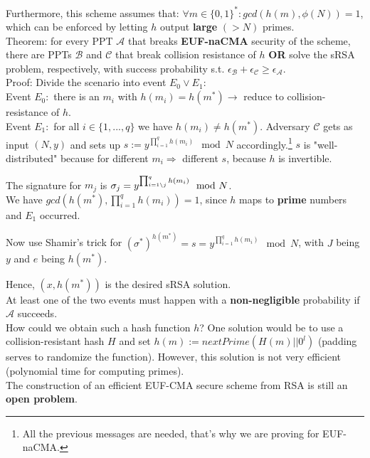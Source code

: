 \documentclass[oneside]{book}
\newcommand{\cA}[0]{\mathcal{A}}
\newcommand{\cB}[0]{\mathcal{B}}
\newcommand{\cC}[0]{\mathcal{C}}
\begin{document}
Furthermore, this scheme assumes that: $\forall m \in \{0,1\}^*: gcd(h(m), \phi(N)) = 1$, which can be enforced by letting $h$ output \textbf{large} $(> N)$ primes.\\

Theorem: for every PPT $\cA$ that breaks \textbf{EUF-naCMA} security of the scheme, there are PPTs $\cB$ and $\cC$ that break collision resistance of $h$ \textbf{OR} solve the sRSA problem, respectively, with success probability s.t. $\epsilon_\cB + \epsilon_\cC \ge \epsilon_\cA$.\\

Proof: Divide the scenario into event $E_0 \lor E_1$:\\

Event $E_0: $ there is an $m_i$ with $h(m_i) = h(m^*) \rightarrow$ reduce to collision-resistance of $h$.\\

Event $E_1: $ for all $i \in \{1, ..., q\}$ we have $h(m_i) \neq h(m^*)$. Adversary $\cC$ gets as input $(N,y)$ and sets up $s:=y^{\prod_{i=1}^{q} h(m_i)} \mod N$ accordingly.\footnote{All the previous messages are needed, that's why we are proving for EUF-naCMA.} $s$ is "well-distributed" because for different $m_i \Rightarrow$ different $s$, because $h$ is invertible.

The signature for $m_j$ is $\sigma_j = y^{\prod_{i=1 \char`\\ j}^{q} h(m_i)} \mod N$.\\

We have $gcd(h(m^*), \prod_{i=1}^q h(m_i)) = 1$, since $h$ maps to \textbf{prime} numbers and $E_1$ occurred.

Now use Shamir's trick for $(\sigma^*)^{h(m^*)} = s = y^{\prod_{i=1}^{q} h(m_i)} \mod N$, with $J$ being $y$ and $e$ being $h(m^*)$.

Hence, $(x, h(m^*))$ is the desired sRSA solution.\\

At least one of the two events must happen with a \textbf{non-negligible} probability if $\cA$ succeeds.\\

How could we obtain such a hash function $h$? One solution would be to use a collision-resistant hash $H$ and set $h(m) := nextPrime(H(m)||0^l)$ (padding serves to randomize the function).
However, this solution is not very efficient (polynomial time for computing primes).\\

The construction of an efficient EUF-CMA secure scheme from RSA is still an \textbf{open problem}.
\end{document}
